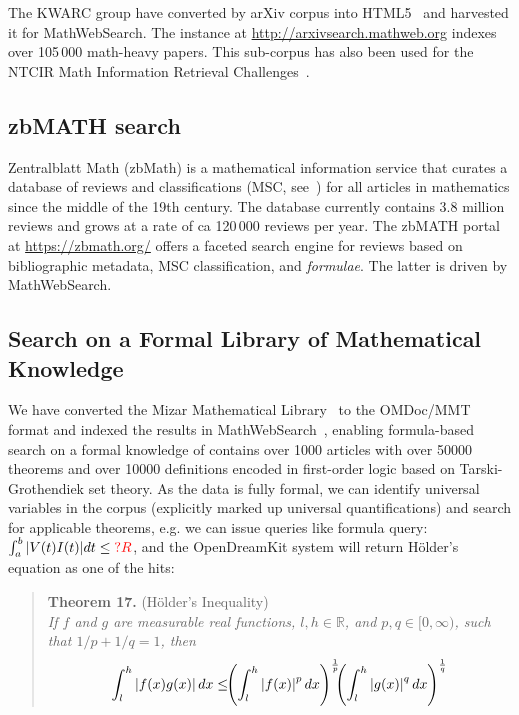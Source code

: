 \documentclass{deliverablereport}
\def\pn{OpenDreamKit\xspace}
\def\MWS{\textsf{MathWebSearch}\xspace}
\begin{document}
The KWARC group have converted by arXiv corpus into HTML5~\cite{StaKoh:tlcspx10} and
harvested it for \MWS. The instance at \url{http://arxivsearch.mathweb.org}
indexes over 105\,000 math-heavy papers. This sub-corpus has also been used for the NTCIR
Math Information Retrieval
Challenges~\cite{AizKohOun:nmpto13,AizKohOunSch:nmto14,AizKohOunSch:nmto16}.

\subsection{zbMATH search}

Zentralblatt Math (zbMath) is a mathematical information service that curates a database
of reviews and classifications (MSC, see~\cite{MSC2010}) for all articles in mathematics
since the middle of the 19th century. The database currently contains 3.8 million reviews
and grows at a rate of ca 120\,000 reviews per year. The zbMATH portal at
\url{https://zbmath.org/} offers a faceted search engine for reviews based on
bibliographic metadata, MSC classification, and \emph{formulae}. The latter is driven by
\MWS.

\subsection{Search on a Formal Library of Mathematical Knowledge}

We have converted the Mizar Mathematical Library~\cite{MizarKB:on} to the OMDoc/MMT format
and indexed the results in \MWS~\cite{IanKohRabUrb:tmmliotaa13}, enabling
formula-based search on a formal knowledge of contains over 1000 articles with over 50000
theorems and over 10000 definitions encoded in first-order logic based on
Tarski-Grothendiek set theory. As the data is fully formal, we can identify universal
variables in the corpus (explicitly marked up universal quantifications) and search for
applicable theorems, e.g. we can issue queries like formula query:
\def\var#1{\textcolor{red}{?#1}} $\int_a^b |V(t)I(t)| dt\leq\var{R}$, and the \pn system
will return H\"older's equation as one of the hits:
\begin{quote}
  \textbf{Theorem 17.} (H\"older's Inequality)\\\it
  If $f$ and $g$ are measurable real functions, $l,h\in\mathbb{R}$, and  $p,q\in
  [0,\infty)$, such that $1/p + 1/q = 1$, then 
  \begin{equation}\label{eq:hi}
  \int_l^h \left|f(x)g(x)\right| dx \leq\kern-.4em 
    \left(\int_l^h\left|f(x)\right|^p dx\right)^\frac{1}{p} 
    \kern-.5em
    \left(\int_l^h\left|g(x)\right|^q dx \right)^\frac{1}{q}
  \end{equation}
\end{quote}
\end{document}
